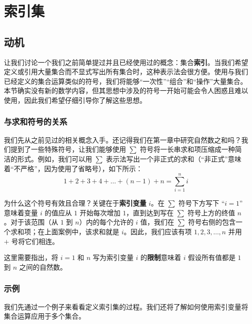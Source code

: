 \section{索引集}

\subsection{动机}

让我们讨论一个我们之前简单提过并且已经使用过的概念：集合\textbf{索引}。当我们希望定义或引用大量集合而不显式写出所有集合时，这种表示法会很方便。使用与我们已经定义的集合运算类似的符号，我们将能够``一次性''``组合''和``操作''大量集合。本节确实没有新的数学内容，但其思想中涉及的符号一开始可能会令人困惑且难以使用，因此我们希望仔细引导你了解这些思想。

\subsubsection*{与求和符号的关系}

我们先从之前见过的相关概念入手。还记得我们在第一章中研究自然数之和吗？我们提到了一些特殊符号，让我们能够使用 $\sum$ 符号将一长串求和项压缩成一种简洁的形式。例如，我们可以用 $\sum$ 表示法写出一个非正式的求和（``非正式''意味着``不严格''，因为使用了省略号），如下所示：
\[1 + 2 + 3 + 4 + \dots + (n - 1) + n = \sum_{i=1}^{n} i\]

为什么这个符号有效且合理？关键在于\textbf{索引变量} $i$。在 $\sum$ 符号下方写下 ``$i = 1$'' 意味着变量 $i$ 的值应从 $1$ 开始每次增加 $1$，直到达到写在 $\sum$ 符号上方的终值 $n$。对于该范围（从 $1$ 到 $n$）内的每个允许的 $i$ 值，我们在 $\sum$ 符号右侧的包含一个求和项；在上面案例中，该求和就是 $i$。因此，我们应该有项 $1, 2, 3,\dots, n$ 并用 $+$ 号将它们相连。

这里需要指出，将 $i = 1$ 和 $n$ 写为索引变量 $i$ 的\textbf{限制}意味着 $i$ 假设所有值都是 $1$ 到 $n$ 之间的自然数。

\subsubsection*{示例}

我们先通过一个例子来看看定义索引集的过程。我们还将了解如何使用索引变量将集合运算应用于多个集合。\\

